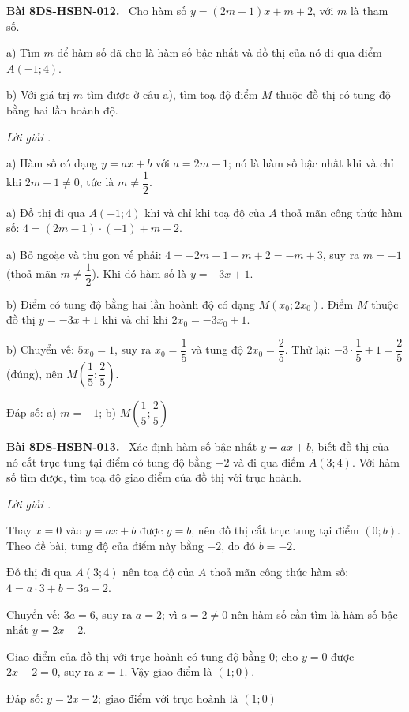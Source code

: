 \documentclass[12pt,a4paper]{article}
\newenvironment{problem}[1][]{\par\medskip\noindent\textbf{Bài #1.}\ }{\par}
\newenvironment{solution}[1][]{\par\noindent\textit{Lời giải #1.}\par}{\par}
\begin{document}
\begin{problem}[8DS-HSBN-012]
Cho hàm số $y = (2m - 1)x + m + 2$, với $m$ là tham số.

a) Tìm $m$ để hàm số đã cho là hàm số bậc nhất và đồ thị của nó đi qua điểm $A(-1; 4)$.

b) Với giá trị $m$ tìm được ở câu a), tìm toạ độ điểm $M$ thuộc đồ thị có tung độ bằng hai lần hoành độ.

\begin{solution}
a) Hàm số có dạng $y = ax + b$ với $a = 2m - 1$; nó là hàm số bậc nhất khi và chỉ khi $2m - 1 \neq 0$, tức là $m \neq \dfrac{1}{2}$.

a) Đồ thị đi qua $A(-1; 4)$ khi và chỉ khi toạ độ của $A$ thoả mãn công thức hàm số: $4 = (2m - 1) \cdot (-1) + m + 2$.

a) Bỏ ngoặc và thu gọn vế phải: $4 = -2m + 1 + m + 2 = -m + 3$, suy ra $m = -1$ (thoả mãn $m \neq \dfrac{1}{2}$). Khi đó hàm số là $y = -3x + 1$.

b) Điểm có tung độ bằng hai lần hoành độ có dạng $M(x_0; 2x_0)$. Điểm $M$ thuộc đồ thị $y = -3x + 1$ khi và chỉ khi $2x_0 = -3x_0 + 1$.

b) Chuyển vế: $5x_0 = 1$, suy ra $x_0 = \dfrac{1}{5}$ và tung độ $2x_0 = \dfrac{2}{5}$. Thử lại: $-3 \cdot \dfrac{1}{5} + 1 = \dfrac{2}{5}$ (đúng), nên $M\left(\dfrac{1}{5}; \dfrac{2}{5}\right)$.

Đáp số: a) $\boxed{m = -1}$; b) $\boxed{M\left(\dfrac{1}{5}; \dfrac{2}{5}\right)}$
\end{solution}
\end{problem}

\begin{problem}[8DS-HSBN-013]
Xác định hàm số bậc nhất $y = ax + b$, biết đồ thị của nó cắt trục tung tại điểm có tung độ bằng $-2$ và đi qua điểm $A(3; 4)$. Với hàm số tìm được, tìm toạ độ giao điểm của đồ thị với trục hoành.

\begin{solution}
Thay $x = 0$ vào $y = ax + b$ được $y = b$, nên đồ thị cắt trục tung tại điểm $(0; b)$. Theo đề bài, tung độ của điểm này bằng $-2$, do đó $b = -2$.

Đồ thị đi qua $A(3; 4)$ nên toạ độ của $A$ thoả mãn công thức hàm số: $4 = a \cdot 3 + b = 3a - 2$.

Chuyển vế: $3a = 6$, suy ra $a = 2$; vì $a = 2 \neq 0$ nên hàm số cần tìm là hàm số bậc nhất $y = 2x - 2$.

Giao điểm của đồ thị với trục hoành có tung độ bằng $0$; cho $y = 0$ được $2x - 2 = 0$, suy ra $x = 1$. Vậy giao điểm là $(1; 0)$.

Đáp số: $\boxed{y = 2x - 2;\ \text{giao điểm với trục hoành là } (1; 0)}$
\end{solution}
\end{problem}
\end{document}
